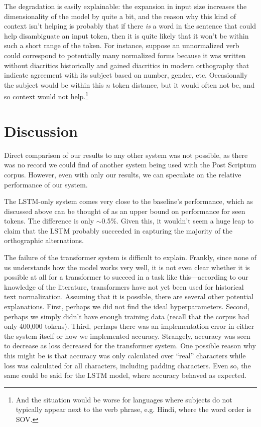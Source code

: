\documentclass[11pt,a4paper]{article}
\begin{document}
The degradation is easily explainable: the expansion in input size increases the dimensionality of the model by quite a bit, and the reason why this kind of context isn't helping is probably that if there \emph{is} a word in the sentence that could help disambiguate an input token, then it is quite likely that it won't be within such a short range of the token. For instance, suppose an unnormalized verb could correspond to potentially many normalized forms because it was written without diacritics historically and gained diacritics in modern orthography that indicate agreement with its subject based on number, gender, etc. Occasionally the subject would be within this $n$ token distance, but it would often not be, and so context would not help.\footnote{And the situation would be worse for languages where subjects do not typically appear next to the verb phrase, e.g. Hindi, where the word order is SOV.}

\section{Discussion}
Direct comparison of our results to any other system was not possible, as there was no record we could find of another system being used with the Post Scriptum corpus. However, even with only our results, we can speculate on the relative performance of our system.

The LSTM-only system comes very close to the baseline’s performance, which as discussed above can be thought of as an upper bound on performance for seen tokens. The difference is only $\sim$0.5\%. Given this, it wouldn't seem a huge leap to claim that the LSTM probably succeeded in capturing the majority of the orthographic alternations. 

The failure of the transformer system is difficult to explain. Frankly, since none of us understands how the model works very well, it is not even clear whether it is possible at all for a transformer to succeed in a task like this---according to our knowledge of the literature, transformers have not yet been used for historical text normalization. Assuming that it is possible, there are several other potential explanations. First, perhaps we did not find the ideal hyperparameters. Second, perhaps we simply didn't have enough training data (recall that the corpus had only 400,000 tokens). Third, perhaps there was an implementation error in either the system itself or how we implemented accuracy. Strangely, accuracy was seen to decrease as loss decreased for the transformer system. One possible reason why this might be is that accuracy was only calculated over ``real'' characters while loss was calculated for all characters, including padding characters. Even so, the same could be said for the LSTM model, where accuracy behaved as expected.
\end{document}
